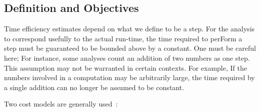 \documentclass[12pt]{book} %
\begin{document}
\subsection{Definition and Objectives}
Time efficiency estimates depend on what we define to be a step. For the analysis to correspond usefully to the actual run-time, the time required to perForm a step must be guaranteed to be bounded above by a constant. One must be careful here; For instance, some analyses count an addition of two numbers as one step. This assumption may not be warranted in certain contexts. For example, If the numbers involved in a computation may be arbitrarily large, the time required by a single addition can no longer be assumed to be constant.

Two cost models are generally used~\cite{AhoHopcroft1974, Hromkovič2004, Ausiello1999, Wegener20, Tarjan1983}:
\end{document}
